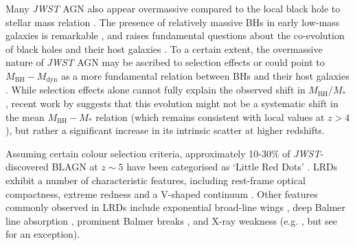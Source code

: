 \documentclass[fleqn,usenatbib]{mnras}
\newcommand{\jwst}{\textit{JWST}\xspace}
\begin{document}
Many \jwst AGN also appear overmassive compared to the local black hole to stellar mass relation \citep[$M_\mathrm{BH}$--$M_\ast$; e.g.,][]{Maiolino2024_JADES, Furtak2024, Juodzbalis2024_Nature, Juodzbalis2026_JADEScensus, Chen2025, JonesKocevski2025, Ubler2023}. 
The presence of relatively massive BHs in early low-mass galaxies is remarkable \citep{Mezcua2024}, and raises fundamental questions about the co-evolution of black holes and their host galaxies \citep[e.g.][]{Smith_rev2019,Inayoshi_rev2020}. 
To a certain extent, the overmassive nature of \jwst AGN may be ascribed to selection effects \citep{Juodzbalis2026_JADEScensus, Li2025, Geris2026, Habouzit2025} or could point to $M_\mathrm{BH}-M_\mathrm{dyn}$ as a more fundamental relation between BHs and their host galaxies \citep{McClymont2026_BH, Danhaive2026_GEKO, Maiolino2024_JADES}. 
While selection effects alone cannot fully explain the observed shift in $M_\mathrm{BH}/M_\ast$ \citep{PacucciLoeb2024, JonesKocevski2025}, recent work by \cite{Ziparo2026} suggests that this evolution might not be a systematic shift in the mean $M_\mathrm{BH}-M_\ast$ relation (which remains consistent with local values at $z>4$), but rather a significant increase in its intrinsic scatter at higher redshifts.



Assuming certain colour selection criteria, approximately 10-30\% \citep{Hainline2025} of \jwst-discovered BLAGN at $z\sim5$ have been categorised as `Little Red Dots' \citep[LRDs;][]{Matthee2024, Hviding2025}.
LRDs exhibit a number of characteristic features, including rest-frame optical compactness, extreme redness and a V-shaped continuum \citep[e.g.][]{Matthee2024, Kocevski2025, Setton2025}. 
Other features commonly observed in LRDs \citep[though not exclusive to the LRD population, see e.g.][]{Brazzini2026} include exponential broad-line wings \citep[e.g.][]{Rusakov2026}, deep Balmer line absorption \citep[][]{Juodzbalis2024_Rosetta, Lin2026_COSMOS, DEugenio2025, DEugenio2026}, prominent Balmer breaks \citep[e.g.][]{Labbe2024, Baggen2024, Setton2025, deGraaff2025}, and X-ray weakness (e.g. \citealt{Yue2024_Stack,Maiolino2025_Chandra}, but see \citealt{Hviding2026} for an exception).
\end{document}
